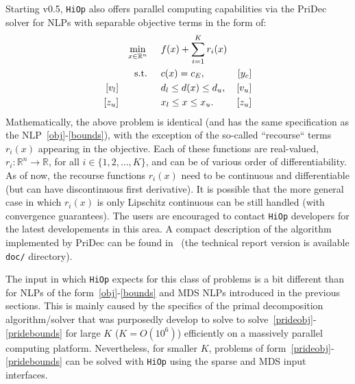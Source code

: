 \documentclass[11pt]{article}
\newcommand{\Hi}{\texttt{HiOp}\xspace}
\begin{document}
Starting v0.5, \Hi also offers parallel computing capabilities via the PriDec solver for NLPs with separable objective terms in the form of:
\begin{align}
&&&&\min_{x\in\mathbb{R}^n} & \hspace{0.5cm} f(x) + \sum_{i=1}^K r_i(x) &&&& \label{prideobj}\\
&&&&\textnormal{s.t.} &\hspace{0.5cm}  c(x)=c_E,  &[y_c]&&&\\
&&[v_l]&&& \hspace{0.5cm} d_l \leq d(x) \leq d_u,  &[v_u]&&&\label{prideineq} \\
&&[z_u]&&& \hspace{0.5cm} x_l \leq x \leq x_u. & [z_u] &&&\label{pridebounds}
\end{align}
Mathematically, the above problem is identical (and has the same specification as the NLP~\eqref{obj}-\eqref{bounds}), with the exception of the so-called ``recourse`` terms $r_i(x)$ appearing in the objective. Each of these functions are real-valued, $r_i:\mathbb{R}^n\rightarrow \mathbb{R}$, for all $i\in\{1,2,\ldots, K\}$, and can be of various order of differentiability. As of now, the recourse functions $r_i(x)$ need to be continuous and differentiable (but can have discontinuous first derivative). It is possible that the more general case in which $r_i(x)$ is only Lipschitz continuous can be still handled (with convergence guarantees). The users are encouraged to contact \Hi developers for the latest developements in this area. A compact description of the algorithm implemented by PriDec can be found in~\cite{pridec_impl} (the technical report version is available \texttt{doc/} directory).

The input in which \Hi expects for this class of problems is a bit different than for NLPs of the form~\eqref{obj}-\eqref{bounds} and MDS NLPs introduced in the previous sections. This is mainly caused by the specifics of the primal decomposition algorithm/solver that was purposedly develop to solve to solve~\eqref{prideobj}-\eqref{pridebounds} for large $K$ ($K=O(10^6)$) efficiently on a massively parallel computing platform. Nevertheless, for smaller $K$, problems of form~\eqref{prideobj}-\eqref{pridebounds} can be solved with \Hi using the sparse and MDS input interfaces.
\end{document}

